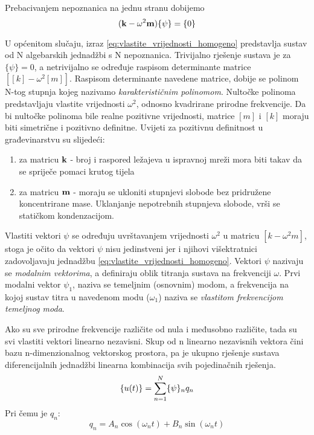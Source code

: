 Prebacivanjem nepoznanica na jednu stranu dobijemo
\begin{equation}\label{eq:vlastite_vrijednosti_homogeno}
    (\kk-\omega^2\mm)\vtor{\psi}{}=\vtor{0}{}
\end{equation}

U općenitom slučaju, izraz \eqref{eq:vlastite_vrijednosti_homogeno} predstavlja
sustav od N algebarskih jednadžbi s N nepoznanica. Trivijalno rješenje sustava je za
$\{\psi\}={0}$, a netrivijalno se određuje raspisom determinante matrice
$[[k]-\omega^2[m]]$. Raspisom determinante navedene matrice, dobije se polinom N-tog
stupnja kojeg nazivamo \textit{karakterističnim polinomom}. Nultočke polinoma
predstavljaju vlastite vrijednosti $\omega^2$, odnosno kvadrirane prirodne
frekvencije. Da bi nultočke polinoma bile realne pozitivne vrijednosti, matrice $[m]$
i $[k]$ moraju biti simetrične i pozitivno definitne. Uvijeti za pozitivnu
definitnost u građevinarstvu su slijedeći:
\begin{enumerate}
    \item za matricu $\mathbf{k}$ - broj i raspored ležajeva u ispravnoj mreži mora biti
        takav da se spriječe pomaci krutog tijela
    \item za matricu $\mathbf{m}$ - moraju se ukloniti stupnjevi slobode bez pridružene
        koncentrirane mase. Uklanjanje nepotrebnih stupnjeva slobode, vrši se
        statičkom kondenzacijom.
\end{enumerate}

Vlastiti vektori $\psi$ se određuju uvrštavanjem vrijednosti $\omega^2$ u matricu
$[k-\omega^2m]$, stoga je očito da vektori $\psi$ nisu jedinstveni jer i njihovi
višektratnici zadovoljavaju jednadžbu \eqref{eq:vlastite_vrijednosti_homogeno}.
Vektori $\psi$ nazivaju se \textit{modalnim vektorima}, a definiraju oblik titranja
sustava na frekvenciji $\omega$. Prvi modalni vektor $\psi_1$, naziva se temeljnim
(osnovnim) modom, a frekvencija na kojoj sustav titra u navedenom modu ($\omega_1$)
naziva se \textit{vlastitom frekvencijom temeljnog moda}.
\par

Ako su sve prirodne frekvencije različite od nula i međusobno različite, tada su svi
vlastiti vektori linearno nezavisni. Skup od n linearno nezavisnih vektora čini bazu
n-dimenzionalnog vektorskog prostora, pa je ukupno rješenje sustava diferencijalnih
jednadžbi linearna kombinacija svih pojedinačnih rješenja.
\begin{equation}\label{eq:opce_rjesenje_sustava}
    \vtor{u(t)}{}=\sum_{n=1}^N\vtor{\psi}{}_nq_n 
\end{equation}
Pri čemu je $q_n$:
\begin{equation}
    q_n=A_n\cos(\omega_n t) + B_n\sin(\omega_n t)
\end{equation}

